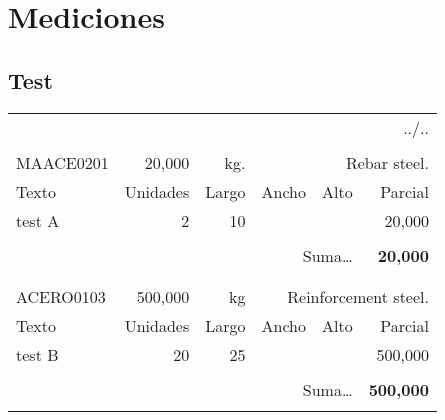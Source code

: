 \documentclass{book}%
\begin{document}
%
\normalsize%
\part{Mediciones}%
\chapter{Test}%
\begin{longtable}{lrrrrr}%
\multicolumn{6}{r}{../..}\\%
\endfoot%
\endlastfoot%
&&&&&\\%
MAACE0201&    20,000& kg.&\multicolumn{3}{p{6cm}}{\scriptsize Rebar steel.\normalsize}\\%
Texto&Unidades&Largo&Ancho&Alto&Parcial\\%
\hline%
\multicolumn{1}{p{3.5cm}}{test A}&2&10&&&    20,000\\%
&&&&&\\%
\multicolumn{5}{r}{Suma\ldots}&\textbf{    20,000}\\%
\hline%
&&&&&\\%
&&&&&\\%
ACERO0103&   500,000& kg&\multicolumn{3}{p{6cm}}{\scriptsize Reinforcement steel.\normalsize}\\%
Texto&Unidades&Largo&Ancho&Alto&Parcial\\%
\hline%
\multicolumn{1}{p{3.5cm}}{test B}&20&25&&&   500,000\\%
&&&&&\\%
\multicolumn{5}{r}{Suma\ldots}&\textbf{   500,000}\\%
\hline%
&&&&&\\%
\end{longtable}%
\newpage

%
\end{document}
